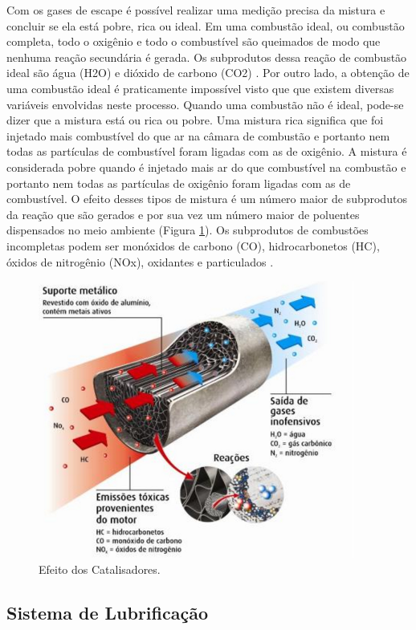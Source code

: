 	Com os gases de escape é possível realizar uma medição precisa da mistura e concluir se ela está pobre, rica ou ideal. Em uma combustão ideal, ou combustão completa, todo o oxigênio e todo o combustível são queimados de modo que nenhuma reação secundária é gerada. Os subprodutos dessa reação de combustão ideal são água (H2O) e dióxido de carbono (CO2) \cite{bosch2004}. Por outro lado, a obtenção de uma combustão ideal é praticamente impossível visto que que existem diversas variáveis envolvidas neste processo. Quando uma combustão não é ideal, pode-se dizer que a mistura está ou rica ou pobre. Uma mistura rica significa que foi injetado mais combustível do que ar na câmara de combustão e portanto nem todas as partículas de combustível foram ligadas com as de oxigênio. A mistura é considerada pobre quando é injetado mais ar do que combustível na combustão e portanto nem todas as partículas de oxigênio foram ligadas com as de combustível. O efeito desses tipos de mistura é um número maior de subprodutos da reação que são gerados e por sua vez um número maior de poluentes dispensados no meio ambiente (Figura \ref{fig:efeitocatalisadores}). Os subprodutos de combustões incompletas podem ser monóxidos de carbono (CO), hidrocarbonetos (HC), óxidos de nitrogênio (NOx), oxidantes e particulados \cite{brunetti2012}.
	
\begin{figure}[h!]
	\centering
	\includegraphics[keepaspectratio=true,scale= 0.7]{figuras/efeitocatalisadores.png}
	\caption{Efeito dos Catalisadores.}
	\label{fig:efeitocatalisadores}
\end{figure}

\subsection{Sistema de Lubrificação}	


